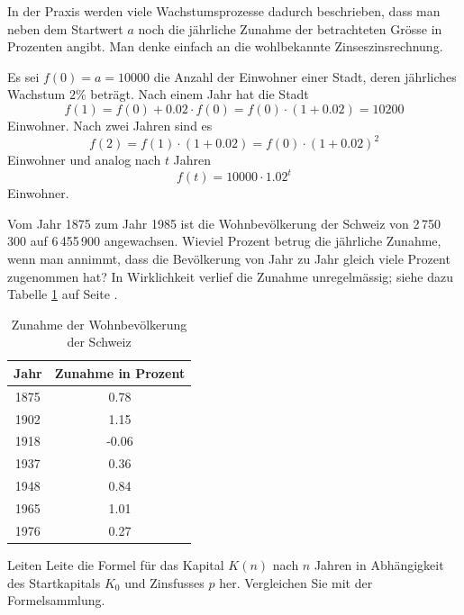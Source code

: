 \documentclass[%
11pt,%
twoside,%
titlepage,%
german,%
headsepline%
]{scrartcl}
\newcommand{\spaltenheight}{\rule{0mm}{3ex}}
\newcommand{\spaltensep}{\\[1ex]}
\begin{document}
\begin{bem}
In der Praxis werden viele Wachstumsprozesse dadurch beschrieben, dass man neben dem Startwert $a$ noch die jährliche Zunahme der betrachteten Grösse in Prozenten angibt. Man denke einfach an die wohlbekannte Zinseszinsrechnung.
\end{bem}

\begin{bsp}
Es sei $f(0)=a=10000$ die Anzahl der Einwohner einer Stadt, deren jährliches Wachstum $2\%$ beträgt. Nach einem Jahr hat die Stadt $$f(1)=f(0)+0.02\cdot f(0)=f(0)\cdot(1+0.02)=10200$$ Einwohner. Nach zwei Jahren sind es
$$f(2)=f(1)\cdot(1+0.02)=f(0)\cdot(1+0.02)^2$$ Einwohner und analog nach $t$ Jahren
$$f(t)=10000\cdot1.02^t$$ Einwohner.
\end{bsp}

\begin{ueb}[Schweiz]
Vom Jahr 1875 zum Jahr 1985 ist die Wohnbevölkerung der Schweiz von 2\,750\,300 auf 6\,455\,900 angewachsen. Wieviel Prozent betrug die jährliche Zunahme, wenn man annimmt, dass die Bevölkerung von Jahr zu Jahr gleich viele Prozent zugenommen hat?
In Wirklichkeit verlief die Zunahme unregelmässig; siehe dazu Tabelle \ref{tab:bevoelkerung} auf Seite \pageref{tab:bevoelkerung}.
\begin{table}
\small
\begin{center}
\begin{tabular}{|c|c|}
\hline
\rowcolor{Gray}\spaltenheight Jahr & Zunahme in Prozent\spaltensep\hline
\rowcolor{lightyellow}\spaltenheight 1875 & 0.78\spaltensep\hline
\rowcolor{Gray}\spaltenheight 1902 & 1.15\spaltensep\hline
\rowcolor{lightyellow}\spaltenheight 1918 & -0.06\spaltensep\hline
\rowcolor{Gray}\spaltenheight 1937 & 0.36\spaltensep\hline
\rowcolor{lightyellow}\spaltenheight 1948 & 0.84\spaltensep\hline
\rowcolor{Gray}\spaltenheight 1965 & 1.01\spaltensep\hline
\rowcolor{lightyellow}\spaltenheight 1976 & 0.27\spaltensep\hline
\end{tabular}
\end{center}
\normalsize
\caption{Zunahme der Wohnbevölkerung der Schweiz}\label{tab:bevoelkerung}
\end{table}
\end{ueb}

\begin{ueb}[Kapital]
Leiten
Leite die Formel für das Kapital $K(n)$ nach $n$ Jahren in Abhängigkeit des Startkapitals $K_0$ und Zinsfusses $p$ her. Vergleichen Sie mit der Formelsammlung.
\end{ueb}
\end{document}
